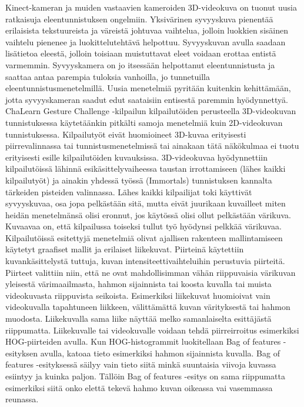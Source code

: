 Kinect-kameran ja muiden vastaavien kameroiden 3D-videokuva on tuonut uusia ratkaisuja eleentunnistuksen ongelmiin. Yksivärinen syvyyskuva pienentää erilaisista tekstuureista
ja väreistä johtuvaa vaihtelua, jolloin luokkien sisäinen vaihtelu pienenee ja luokittelutehtävä helpottuu. Syvyyskuvan avulla
saadaan lisätietoa eleestä, jolloin toisiaan muistuttavat eleet voidaan erottaa entistä varmemmin. Syvyyskamera on jo itsessään
helpottanut eleentunnistusta ja saattaa antaa parempia tuloksia vanhoilla, jo tunnetuilla eleentunnistusmenetelmillä. Uusia menetelmiä
pyritään kuitenkin kehittämään, jotta syvyyskameran saadut edut saataisiin entisestä paremmin hyödynnettyä.\\

ChaLearn Gesture Challenge -kilpailun kilpailutöiden perusteella 3D-videokuvan tunnistuksessa käytetäänkin pitkälti samoja 
menetelmiä kuin 2D-videokuvan tunnistuksessa. Kilpailutyöt eivät huomioineet 3D-kuvaa erityisesti piirrevalinnassa tai tunnistusmenetelmissä 
tai ainakaan tätä näkökulmaa ei tuotu erityisesti esille kilpailutöiden kuvauksissa. 3D-videokuvaa hyödynnettiin kilpailutöissä lähinnä esikäsittelyvaiheessa taustan irrottamiseen 
(lähes kaikki kilpailutyöt) ja ainakin yhdessä työssä (Immortals) tunnistuksen kannalta tärkeiden pisteiden valinnassa. Lähes kaikki kilpailijat 
toki käyttivät syvyyskuvaa, osa jopa pelkästään sitä, mutta eivät juurikaan kuvailleet miten heidän menetelmänsä olisi eronnut, jos käytössä olisi ollut pelkästään värikuva.
Kuvaavaa on, että kilpailussa toiseksi tullut työ hyödynsi pelkkää värikuvaa.\\

Kilpailutöissä esitettyjä menetelmiä olivat ajallisen rakenteen mallintamiseen käytetyt graafiset mallit ja erilaiset liikekuvat. Piirteinä käytettiin 
kuvankäsittelystä tuttuja, kuvan intensiteettivaihteluihin perustuvia piirteitä. Piirteet valittiin niin, että ne ovat mahdollisimman vähän riippuvaisia
 värikuvan yleisestä värimaailmasta, hahmon sijainnista tai koosta kuvalla tai muista videokuvasta riippuvista seikoista. Esimerkiksi liikekuvat huomioivat 
vain videokuvalla tapahtuneen liikkeen, välittämättä kuvan värityksestä tai hahmon muodosta. Liikekuvalla sama liike näyttää melko samanlaiselta esittäjästä 
riippumatta. Liikekuvalle tai videokuvalle voidaan tehdä piirreirroitus esimerkiksi 
HOG-piirteiden avulla. Kun HOG-histogrammit luokitellaan Bag of features -esityksen avulla, katoaa tieto esimerkiksi hahmon sijainnista kuvalla.
Bag of features -esityksessä säilyy vain tieto siitä minkä suuntaisia viivoja kuvassa esiintyy ja kuinka paljon. Tällöin Bag of features -esitys on sama
riippumatta esimerkiksi siitä onko elettä tekevä hahmo kuvan oikeassa vai vasemmassa reunassa.\\

